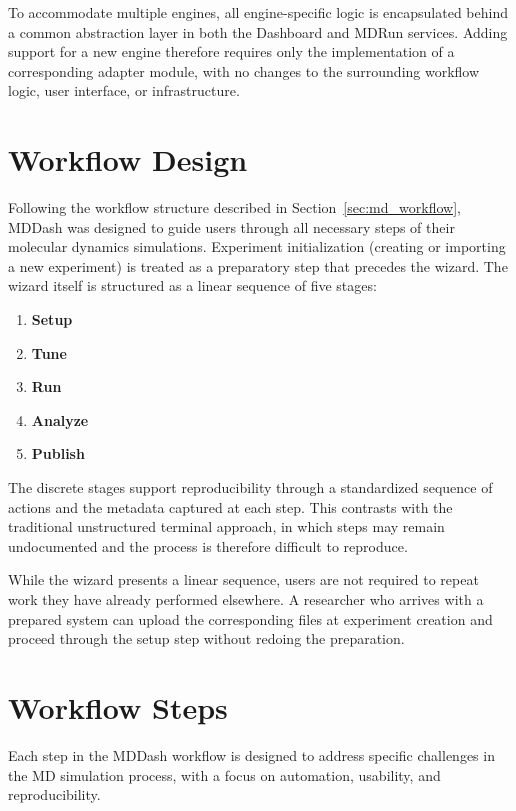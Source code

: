 \documentclass[
  digital,     %
  color,       %
  oneside,     %
  nosansbold,  %
  nocolorbold, %
  lof,         %
  lot,         %
]{fithesis4}
\begin{document}
To accommodate multiple engines, all engine-specific logic is encapsulated behind a common abstraction layer in both the Dashboard and MDRun services. Adding support for a new engine therefore requires only the implementation of a corresponding adapter module, with no changes to the surrounding workflow logic, user interface, or infrastructure.

\section{Workflow Design}

Following the workflow structure described in Section~\ref{sec:md_workflow}, MDDash was designed to guide users through all necessary steps of their molecular dynamics simulations. Experiment initialization (creating or importing a new experiment) is treated as a preparatory step that precedes the wizard. The wizard itself is structured as a linear sequence of five stages:

\begin{enumerate}
    \item \textbf{Setup}
    \item \textbf{Tune}
    \item \textbf{Run}
    \item \textbf{Analyze}
    \item \textbf{Publish}
\end{enumerate}

The discrete stages support reproducibility through a standardized sequence of actions and the metadata captured at each step. This contrasts with the traditional unstructured terminal approach, in which steps may remain undocumented and the process is therefore difficult to reproduce.

While the wizard presents a linear sequence, users are not required to repeat work they have already performed elsewhere. A researcher who arrives with a prepared system can upload the corresponding files at experiment creation and proceed through the setup step without redoing the preparation.

\section{Workflow Steps}
\label{sec:workflow_steps}

Each step in the MDDash workflow is designed to address specific challenges in the MD simulation process, with a focus on automation, usability, and reproducibility.
\end{document}
